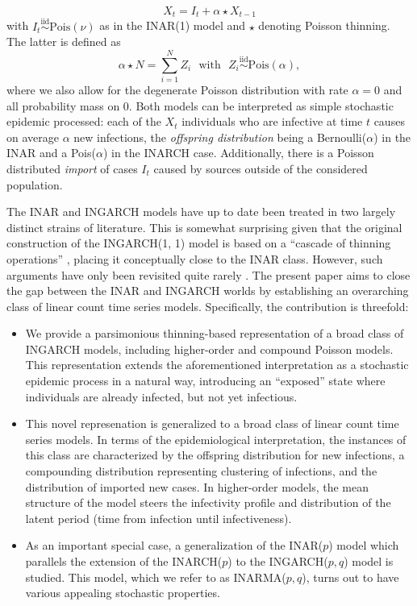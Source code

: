 \documentclass{article}
\begin{document}
$$
X_t = I_t + \alpha \star X_{t- 1}
$$
with $I_t \stackrel{\text{iid}}{\sim} \text{Pois}(\nu)$ as in the INAR(1) model and $\star$ denoting Poisson thinning. The latter is defined as
$$
\alpha \star N = \sum_{i = 1}^N Z_i \ \ \ \text{with} \ \ \ Z_i \stackrel{\text{iid}}{\sim} \text{Pois}(\alpha),
$$
where we also allow for the degenerate Poisson distribution with rate $\alpha = 0$ and all probability mass on 0. Both models can be interpreted as simple stochastic epidemic processed: each of the $X_t$ individuals who are infective at time $t$ causes on average $\alpha$ new infections, the \textit{offspring distribution} being a Bernoulli($\alpha$) in the INAR and a Pois($\alpha$) in the INARCH case. Additionally, there is a Poisson distributed \textit{import} of cases $I_t$ caused by sources outside of the considered population.

The INAR and INGARCH models have up to date been treated in two largely distinct strains of literature. This is somewhat surprising given that the original construction of the INGARCH(1, 1) model is based on a ``cascade of thinning operations'' \citep[p.927]{Ferland2006}, placing it conceptually close to the INAR class. However, such arguments have only been revisited quite rarely \citep{Lu2021}. The present paper aims to close the gap between the INAR and INGARCH worlds by establishing an overarching class of linear count time series models. Specifically, the contribution is threefold:
\begin{itemize}
\item We provide a parsimonious thinning-based representation of a broad class of INGARCH models, including higher-order and compound Poisson \cite{Goncalves2015} models. This representation extends the aforementioned interpretation as a stochastic epidemic process in a natural way, introducing an ``exposed'' state where  individuals are already infected, but not yet infectious.
\item This novel represenation is generalized to a broad class of linear count time series models. In terms of the epidemiological interpretation, the instances of this class are characterized by the offspring distribution for new infections, a compounding distribution representing clustering of infections, and the distribution of imported new cases. In higher-order models, the mean structure of the model steers the infectivity profile and distribution of the latent period (time from infection until infectiveness).
\item As an important special case, a generalization of the INAR($p$) model which parallels the extension of the INARCH($p$) to the INGARCH($p, q$) model is studied. This model, which we refer to as INARMA($p, q$), turns out to have various appealing stochastic properties.
\end{itemize}
\end{document}
